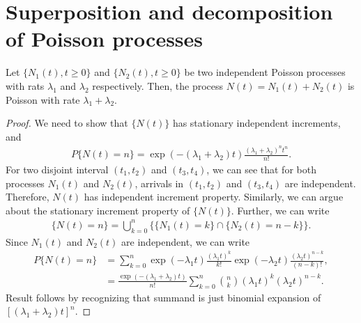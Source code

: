 \documentclass[a4paper,10pt,english]{article}
\begin{document}
\section{Superposition and decomposition of Poisson processes}
\begin{thm} Let $\{N_1(t), t \geqslant  0\}$ and $\{N_2(t), t \geqslant  0\}$ be two independent Poisson processes with rats $\lambda_{1}$ and $\lambda_{2}$ respectively. Then, the process $N(t)= N_{1}(t) +N_{2}(t)$ is Poisson with rate $\lambda_{1}+\lambda_{2}$.
\end{thm}
\begin{proof} We need to show that $\{N(t)\}$ has stationary independent increments, and 
\begin{align*}
	P\{N(t)=n\}=   \exp(-(\lambda_{1}+\lambda_{2})t)\frac{(\lambda_{1}+\lambda_{2})^n t^n}{n!}.
\end{align*}
For two disjoint interval $(t_{1}, t_{2})$ and $(t_3,t_4)$, we can see that for both processes $N_{1}(t)$ and $N_2(t)$,  arrivals in $(t_{1}, t_{2})$ and $(t_3,t_{4})$ are independent. Therefore, $N(t)$ has independent increment property. Similarly, we can argue about the stationary increment property of $\{N(t)\}$. Further, we can write 
\begin{align*}
	\{N(t)=n\} = \bigcup_{k=0}^n\{\{N_1(t) = k\}\cap\{N_2(t) = n-k\}\}.
\end{align*}
Since $N_1(t)$ and $N_2(t)$ are independent, we can write
\begin{align*}
	P\{N(t)=n\} &= \sum_{k=0}^n\exp(-\lambda_1t)\frac{(\lambda_1t)^k}{k!}\exp(-\lambda_2t)\frac{(\lambda_2t)^{n-k}}{(n-k)!},\\
	&= \frac{\exp(-(\lambda_1+\lambda_2)t)}{n!}\sum_{k=0}^n\binom{n}{k}(\lambda_1t)^k(\lambda_2t)^{n-k}.%
\end{align*}
Result follows by recognizing that summand is just binomial expansion of $[(\lambda_1 + \lambda_2)t]^n$.
\end{proof}
\end{document}
